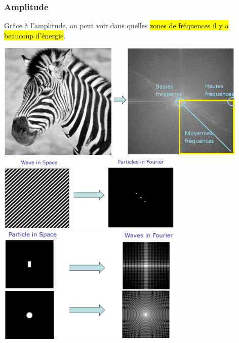 \documentclass[letterpaper, 12pt]{article}
\newcommand{\alinea}{
\hspace*{0.5cm}}
\begin{document}
		\subsubsection{Amplitude}
			\alinea Grâce à l'amplitude, on peut voir dans quelles \hl{zones de fréquences il y a beaucoup d'énergie}.
			\begin{center}
				\includegraphics[width=4.75in]{Images/dft2}
				\includegraphics[width=3.5in]{Images/dft3}
				\includegraphics[width=3.5in]{Images/dft4}
			\end{center}
\end{document}
